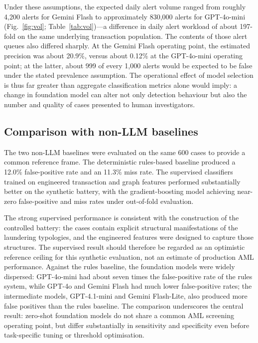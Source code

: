\documentclass[pdflatex,sn-basic,Numbered]{sn-jnl}
\begin{document}
Under these assumptions, the expected daily alert volume ranged from roughly 4,200 alerts for Gemini Flash to approximately 830,000 alerts for GPT-4o-mini (Fig.~\ref{fig:vol}; Table~\ref{tab:vol})---a difference in daily alert workload of about 197-fold on the same underlying transaction population. The contents of those alert queues also differed sharply. At the Gemini Flash operating point, the estimated precision was about 20.9\%, versus about 0.12\% at the GPT-4o-mini operating point; at the latter, about 999 of every 1,000 alerts would be expected to be false under the stated prevalence assumption. The operational effect of model selection is thus far greater than aggregate classification metrics alone would imply: a change in foundation model can alter not only detection behaviour but also the number and quality of cases presented to human investigators.

\subsection{Comparison with non-LLM baselines}\label{sec:baselines}

The two non-LLM baselines were evaluated on the same 600 cases to provide a common reference frame. The deterministic rules-based baseline produced a 12.0\% false-positive rate and an 11.3\% miss rate. The supervised classifiers trained on engineered transaction and graph features performed substantially better on the synthetic battery, with the gradient-boosting model achieving near-zero false-positive and miss rates under out-of-fold evaluation.

The strong supervised performance is consistent with the construction of the controlled battery: the cases contain explicit structural manifestations of the laundering typologies, and the engineered features were designed to capture those structures. The supervised result should therefore be regarded as an optimistic reference ceiling for this synthetic evaluation, not an estimate of production AML performance. Against the rules baseline, the foundation models were widely dispersed: GPT-4o-mini had about seven times the false-positive rate of the rules system, while GPT-4o and Gemini Flash had much lower false-positive rates; the intermediate models, GPT-4.1-mini and Gemini Flash-Lite, also produced more false positives than the rules baseline. The comparison underscores the central result: zero-shot foundation models do not share a common AML screening operating point, but differ substantially in sensitivity and specificity even before task-specific tuning or threshold optimisation.
\end{document}
